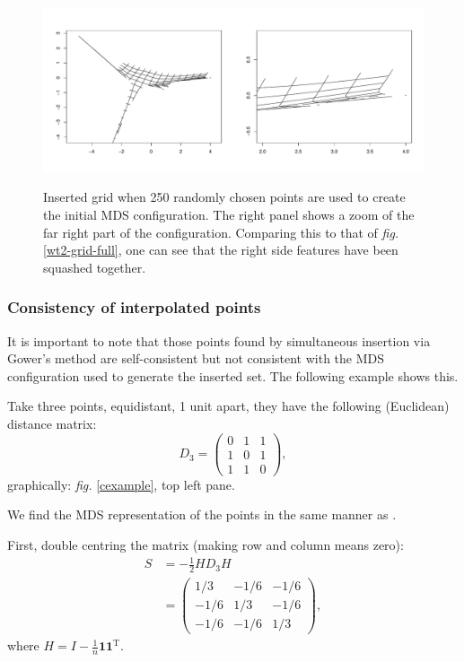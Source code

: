 \documentclass[a4paper,10pt]{article}
\newcommand{\fig}[1]{\emph{fig.} \ref{#1}}
\begin{document}
\begin{figure}
\centering
\includegraphics[width=5in]{figs/wt2-grid-samp.pdf} \\
\caption{Inserted grid when 250 randomly chosen points are used to create the initial MDS configuration. The right panel shows a zoom of the far right part of the configuration. Comparing this to that of \fig{wt2-grid-full}, one can see that the right side features have been squashed together.}
\label{wt2-grid-samp}
\end{figure}


\subsubsection{Consistency of interpolated points}

It is important to note that those points found by simultaneous insertion via Gower's method are self-consistent but not consistent with the MDS configuration used to generate the inserted set. The following example shows this.

Take three points, equidistant, 1 unit apart, they have the following (Euclidean) distance matrix:
\begin{equation*}
D_3 = \begin{pmatrix} 0 & 1& 1\\1 & 0 & 1\\ 1 & 1 & 0\end{pmatrix},
\end{equation*}
graphically: \fig{cexample}, top left pane.

We find the MDS representation of the points in the same manner as \cite{diaconis08}.

First, double centring the matrix (making row and column means zero):
\begin{equation*}
\begin{aligned}
S &= -\frac{1}{2} HD_3H\\
    &= \begin{pmatrix} 1/3 & -1/6 & -1/6\\-1/6 & 1/3 & -1/6\\ -1/6 & -1/6 & 1/3\end{pmatrix},
\end{aligned}
\end{equation*}
where $H=I-\frac{1}{n}\mathbf{1}\mathbf{1}^\text{T}$.
\end{document}
